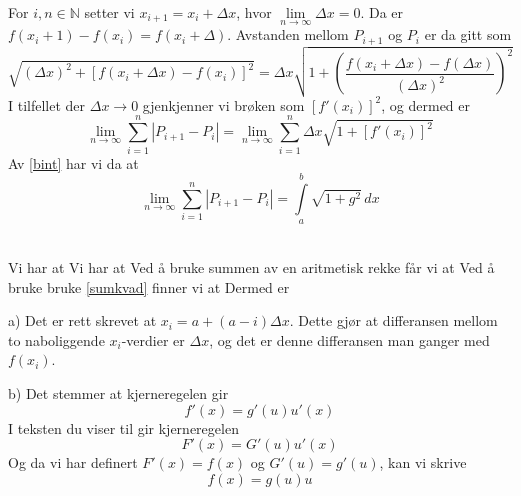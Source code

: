 \newpage
{}
For $ i, n\in \mathbb{N} $ setter vi $ {x_{i+1}=x_i+\Delta x} $, hvor $ \lim\limits_{n\to \infty} {\Delta x = 0} $. Da er \\$ {f(x_i+1)-f(x_i)=f(x_i+\Delta)} $. Avstanden mellom $ P_{i+1} $ og $ P_{i} $ er da gitt som
\[ \sqrt{(\Delta x)^2+[f(x_i+\Delta x)-f(x_i)]^2}=\Delta x\sqrt{1+\left(\frac{f(x_i+\Delta x)-f(\Delta x)}{(\Delta x)^2}\right)^2} \]
I tilfellet der $ {\Delta x\to 0} $ gjenkjenner vi brøken som $ \left[f'(x_i)\right]^2 $, og dermed er
\[ \lim\limits_{n\to \infty}\sum\limits_{i=1}^n \left|P_{i+1}-P_i\right|=\lim\limits_{n\to \infty}\sum\limits_{i=1}^n\Delta x\sqrt{1+[f'(x_i)]^2} \]
Av \eqref{bint} har vi da at
\[ \lim\limits_{n\to \infty}\sum\limits_{i=1}^n \left|P_{i+1}-P_i\right|=\int\limits_{a}^b \sqrt{1+g^2}\,dx \]

\\
Vi har at
Vi har at
Ved å bruke summen av en aritmetisk rekke får vi at
Ved å bruke bruke \eqref{sumkvad} finner vi at
Dermed er

\newpage
a) Det er rett skrevet at $ x_i=a+(a-i)\Delta x $. Dette gjør at differansen mellom to naboliggende $ x_i $-verdier er $ \Delta x $, og det er denne differansen man ganger med $ f(x_i) $.\vsk

b) Det stemmer at kjerneregelen gir
\[ f'(x)=g'(u)u'(x) \]
I teksten du viser til gir kjerneregelen
\[ F'(x)=G'(u)u'(x) \]
Og da vi har definert $ F'(x)=f(x) $ og $ G'(u)=g'(u) $, kan vi skrive
\[ f(x)=g(u)u \]


